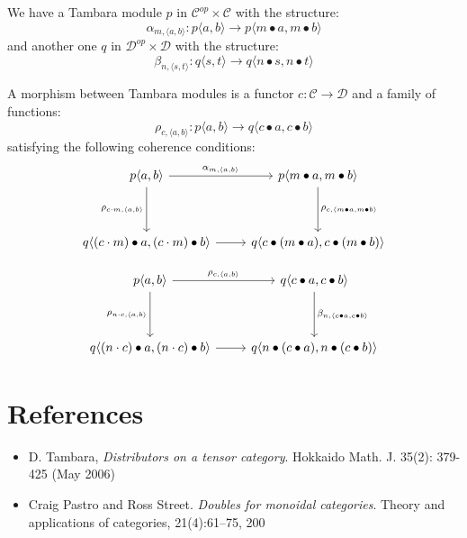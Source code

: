 \documentclass[11pt]{amsart}
\newcommand{\cat}[1]{\mathcal{#1}}%
\begin{document}
We have a Tambara module $p$ in $\cat C^{op} \times \cat C$ with the structure:
\[ \alpha_{m, \langle a, b \rangle} \colon p \langle a, b \rangle \to p \langle m \bullet a, m \bullet b \rangle \]
and another one $q$ in $\cat D^{op} \times \cat D$  with the structure:
\[ \beta_{n, \langle s, t \rangle} \colon q \langle s, t \rangle \to q \langle n \bullet s, n \bullet t \rangle \]

A morphism between Tambara modules is a functor $c \colon \cat C \to \cat D$ and a family of functions:
\[ \rho_{c, \langle a, b \rangle} \colon p \langle a, b \rangle \to q \langle c \bullet a, c \bullet b \rangle \]
satisfying the following coherence conditions:
\[
 \begin{tikzcd}
 p \langle a, b \rangle
 \arrow[r, "{\alpha_{m, \langle a, b \rangle}}"]
 \arrow[dd, "{\rho_{c \cdot m, \langle a, b \rangle}}"']
& p \langle m \bullet a, m \bullet b \rangle
 \arrow[dd, "{\rho_{c, \langle m \bullet a, m \bullet b \rangle}}"]
 \\
  \\
 q \langle (c \cdot m)  \bullet a, (c \cdot m) \bullet b \rangle
 \arrow[r, ""]
& q \langle c \bullet (m \bullet a), c \bullet (m \bullet b) \rangle
 \end{tikzcd}
\]

\[
 \begin{tikzcd}
 p \langle a, b \rangle
 \arrow[r, "{\rho_{c, \langle a, b \rangle}}"]
 \arrow[dd, "{\rho_{n \cdot c, \langle a, b \rangle}}"']
& q \langle c \bullet a, c \bullet b \rangle
 \arrow[dd, "{\beta_{n, \langle c \bullet a, c \bullet b \rangle}}"]
 \\
  \\
 q \langle (n \cdot c)  \bullet a, (n \cdot c) \bullet b \rangle
 \arrow[r, ""]
& q \langle n \bullet (c \bullet a), n \bullet (c \bullet b) \rangle
 \end{tikzcd}
\]

\section{References}

\begin{itemize}
\item D. Tambara, \emph{Distributors on a tensor category}. Hokkaido Math. J. 35(2): 379-425 (May 2006)

\item Craig Pastro and Ross Street. \emph{Doubles for monoidal categories}. Theory and
applications of categories, 21(4):61–75, 200
\end{itemize}
\end{document}
